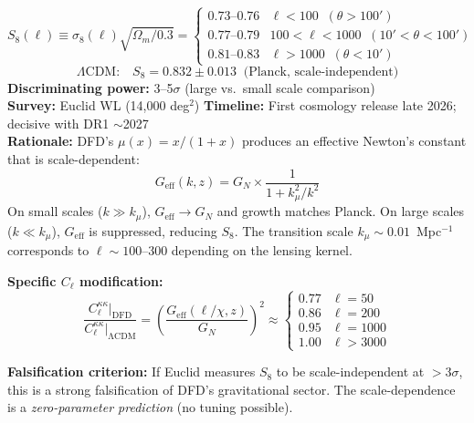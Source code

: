 \documentclass[12pt]{article}
\newcommand{\LCDM}{$\Lambda$CDM}
\begin{document}
\begin{predbox}
\begin{equation}
\boxed{
S_8(\ell) \equiv \sigma_8(\ell)\sqrt{\Omega_m/0.3} = \begin{cases}
0.73\text{--}0.76 & \ell < 100 \;\;(\theta > 100') \\
0.77\text{--}0.79 & 100 < \ell < 1000 \;\;(10' < \theta < 100') \\
0.81\text{--}0.83 & \ell > 1000 \;\;(\theta < 10')
\end{cases}
}
\end{equation}
\begin{equation}
\text{\LCDM:}\quad S_8 = 0.832 \pm 0.013 \;\;\text{(Planck, scale-independent)}
\end{equation}
\textbf{Discriminating power:} 3--5$\sigma$ (large vs.\ small scale comparison)\\
\textbf{Survey:} Euclid WL (14,000 deg$^2$) \quad\textbf{Timeline:} First cosmology release late 2026; decisive with DR1 $\sim$2027\\
\textbf{Rationale:} DFD's $\mu(x)=x/(1+x)$ produces an effective Newton's constant that is scale-dependent:
\begin{equation}
G_\mathrm{eff}(k,z) = G_N \times \frac{1}{1 + k_\mu^2/k^2}
\end{equation}
On small scales ($k \gg k_\mu$), $G_\mathrm{eff} \to G_N$ and growth matches Planck. On large scales ($k \ll k_\mu$), $G_\mathrm{eff}$ is suppressed, reducing $S_8$. The transition scale $k_\mu \sim 0.01$~Mpc$^{-1}$ corresponds to $\ell \sim 100$--300 depending on the lensing kernel.

\medskip\noindent
\textbf{Specific $C_\ell$ modification:}
\begin{equation}
\frac{C_\ell^{\kappa\kappa}\big|_\mathrm{DFD}}{C_\ell^{\kappa\kappa}\big|_\mathrm{\Lambda CDM}} = \left(\frac{G_\mathrm{eff}(\ell/\chi,z)}{G_N}\right)^2 \approx \begin{cases}
0.77 & \ell = 50 \\
0.86 & \ell = 200 \\
0.95 & \ell = 1000 \\
1.00 & \ell > 3000
\end{cases}
\end{equation}

\medskip\noindent
\textbf{Falsification criterion:} If Euclid measures $S_8$ to be scale-independent at $>$3$\sigma$, this is a strong falsification of DFD's gravitational sector. The scale-dependence is a \emph{zero-parameter prediction} (no tuning possible).
\end{predbox}
\end{document}
